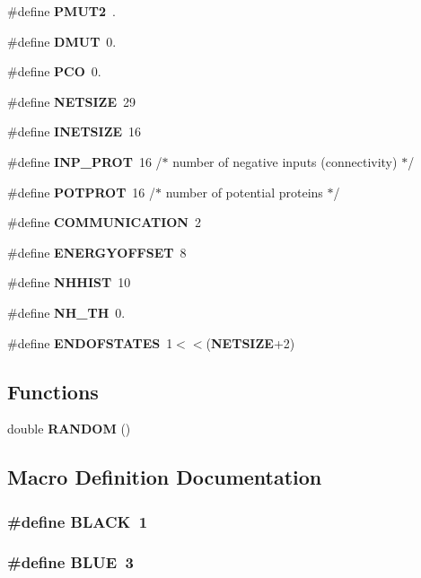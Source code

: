 \begin{DoxyCompactItemize}
\item 
\#define {\bf P\-M\-U\-T2}~.
\item 
\#define {\bf D\-M\-U\-T}~0.
\item 
\#define {\bf P\-C\-O}~0.
\item 
\#define {\bf N\-E\-T\-S\-I\-Z\-E}~29
\item 
\#define {\bf I\-N\-E\-T\-S\-I\-Z\-E}~16
\item 
\#define {\bf I\-N\-P\-\_\-\-P\-R\-O\-T}~16 /$\ast$ number of negative inputs (connectivity) $\ast$/
\item 
\#define {\bf P\-O\-T\-P\-R\-O\-T}~16 /$\ast$ number of potential proteins $\ast$/
\item 
\#define {\bf C\-O\-M\-M\-U\-N\-I\-C\-A\-T\-I\-O\-N}~2
\item 
\#define {\bf E\-N\-E\-R\-G\-Y\-O\-F\-F\-S\-E\-T}~8
\item 
\#define {\bf N\-H\-H\-I\-S\-T}~10
\item 
\#define {\bf N\-H\-\_\-\-T\-H}~0.
\item 
\#define {\bf E\-N\-D\-O\-F\-S\-T\-A\-T\-E\-S}~1$<$$<$({\bf N\-E\-T\-S\-I\-Z\-E}+2)
\end{DoxyCompactItemize}
\subsection*{Functions}
\begin{DoxyCompactItemize}
\item 
double {\bf R\-A\-N\-D\-O\-M} ()
\end{DoxyCompactItemize}


\subsection{Macro Definition Documentation}
\subsubsection[{B\-L\-A\-C\-K}]{\setlength{\rightskip}{0pt plus 5cm}\#define B\-L\-A\-C\-K~1}\label{sticky_8h_a7b3b25cba33b07c303f3060fe41887f6}
\subsubsection[{B\-L\-U\-E}]{\setlength{\rightskip}{0pt plus 5cm}\#define B\-L\-U\-E~3}\label{sticky_8h_a79d10e672abb49ad63eeaa8aaef57c38}
